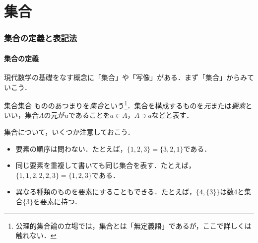 \part{集合}

\begin{abstract}
この章では，現代数学の基礎をなす「集合」を導入する．まず集合と元を定義し，集合の相等・部分集合・真部分集合といった基本概念を確認する．次に，$\mathbb{N},\mathbb{Z},\mathbb{Q},\mathbb{R},\mathbb{C}$ などのよく使う集合の記号と，外延的記法・内包的記法という集合の表記法を整理する．続いて，空集合とべき集合を導入する．最後に，共通部分・和集合・差集合・補集合といった集合の演算を定義し，交換法則・結合律・分配律・ド・モルガンの法則などの基本性質を証明したのち，無限個の集合を扱うための集合族の和集合・共通部分を導入しよう．
\end{abstract}

\section{集合の定義と表記法}

\subsection{集合の定義}

現代数学の基礎をなす概念に「集合」や「写像」がある．まず「集合」からみていこう．
\begin{definition}{集合}{集合}
  もののあつまりを\emph{集合}という\footnote{公理的集合論の立場では，集合とは「無定義語」であるが，ここで詳しくは触れない．}．集合を構成するものを\emph{元}または\emph{要素}といい，集合$A$の元が$a$であることを$a \in A$，$A \ni a$などと表す．
\end{definition}

\begin{remark}[集合の表記に関する注意]
  集合について，いくつか注意しておこう．
  \begin{itemize}
    \item 要素の順序は問わない．たとえば，$\{1,2,3\}=\{3,2,1\}$である．
    \item 同じ要素を重複して書いても同じ集合を表す．たとえば，$\{1,1,2,2,2,3\}=\{1,2,3\}$である．
    \item 異なる種類のものを要素にすることもできる．たとえば，$\{4,\{3\}\}$は数$4$と集合$\{3\}$を要素に持つ．
  \end{itemize}
\end{remark}

